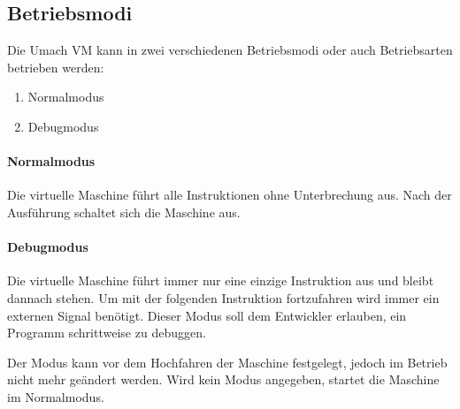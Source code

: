 \subsection{Betriebsmodi}
\label{subsec:Betriebsmodi}

Die Umach VM kann in zwei verschiedenen Betriebsmodi oder auch
Betriebsarten betrieben werden:

\begin{enumerate}
  \item Normalmodus
  \item Debugmodus
\end{enumerate}

\paragraph{Normalmodus} Die virtuelle Maschine führt alle Instruktionen
ohne Unterbrechung aus. Nach der Ausführung schaltet sich die Maschine aus.

\paragraph{Debugmodus} Die virtuelle Maschine führt immer nur eine
einzige Instruktion aus und bleibt dannach stehen. Um mit der folgenden
Instruktion fortzufahren wird immer ein externen Signal benötigt.
Dieser Modus soll dem Entwickler erlauben, ein Programm schrittweise zu
debuggen.

Der Modus kann vor dem Hochfahren der Maschine festgelegt, jedoch im
Betrieb nicht mehr geändert werden. Wird kein Modus angegeben, startet die
Maschine im Normalmodus.




